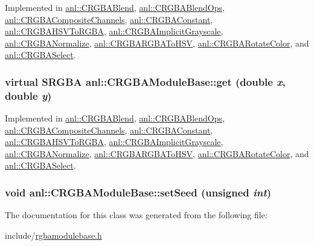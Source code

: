 Implemented in \hyperlink{classanl_1_1CRGBABlend_ab7a8d72d44e559e98eb3945b90db5d52}{anl::CRGBABlend}, \hyperlink{classanl_1_1CRGBABlendOps_a4548f067089dfd648ca57471379377ec}{anl::CRGBABlendOps}, \hyperlink{classanl_1_1CRGBACompositeChannels_a9c3fb9f5a932d5cdd585d53ecab11fa5}{anl::CRGBACompositeChannels}, \hyperlink{classanl_1_1CRGBAConstant_aba1cf079bf221502fe759880358b2370}{anl::CRGBAConstant}, \hyperlink{classanl_1_1CRGBAHSVToRGBA_a99b2e61622cc799b7112e285903c747c}{anl::CRGBAHSVToRGBA}, \hyperlink{classanl_1_1CRGBAImplicitGrayscale_aaa69d1f706bec33d288385fd44c602c7}{anl::CRGBAImplicitGrayscale}, \hyperlink{classanl_1_1CRGBANormalize_aaa04a3a2cb2ce5fd15e574731ac6f183}{anl::CRGBANormalize}, \hyperlink{classanl_1_1CRGBARGBAToHSV_a4d51e587ffc235a8620f516b2a701288}{anl::CRGBARGBAToHSV}, \hyperlink{classanl_1_1CRGBARotateColor_a8dbecf4dacad0814addb213cbd83b6cc}{anl::CRGBARotateColor}, and \hyperlink{classanl_1_1CRGBASelect_acc89668e15e5db0f377a8c35e920a223}{anl::CRGBASelect}.\hypertarget{classanl_1_1CRGBAModuleBase_afb6896d38ae92b9bb784fe5dc731ae67}{
\subsubsection[{get}]{\setlength{\rightskip}{0pt plus 5cm}virtual {\bf SRGBA} anl::CRGBAModuleBase::get (double {\em x}, \/  double {\em y})}}
\label{classanl_1_1CRGBAModuleBase_afb6896d38ae92b9bb784fe5dc731ae67}


Implemented in \hyperlink{classanl_1_1CRGBABlend_a3cc6fa4393c7cc41da66be7e460b609f}{anl::CRGBABlend}, \hyperlink{classanl_1_1CRGBABlendOps_aacba235e62c02f99459fed2e79992fe3}{anl::CRGBABlendOps}, \hyperlink{classanl_1_1CRGBACompositeChannels_afbae35ad9a4608d0d2a375636b538d8f}{anl::CRGBACompositeChannels}, \hyperlink{classanl_1_1CRGBAConstant_a2b2d721d125057ef64b73c8991f9cdf2}{anl::CRGBAConstant}, \hyperlink{classanl_1_1CRGBAHSVToRGBA_ad1a4aecb9c5faa9927f7a8292cc46546}{anl::CRGBAHSVToRGBA}, \hyperlink{classanl_1_1CRGBAImplicitGrayscale_a806ae7b00b96c104a926df3de2b9d3fb}{anl::CRGBAImplicitGrayscale}, \hyperlink{classanl_1_1CRGBANormalize_a02fcc5f3c5df6750712c28afa66a6ccd}{anl::CRGBANormalize}, \hyperlink{classanl_1_1CRGBARGBAToHSV_a8252d1e38975101abf4ea30a23595a3a}{anl::CRGBARGBAToHSV}, \hyperlink{classanl_1_1CRGBARotateColor_a14d2e43da4ad85d88b6bfce5e5cafcae}{anl::CRGBARotateColor}, and \hyperlink{classanl_1_1CRGBASelect_a43f0fe9cb33e1dab8488c2413337900d}{anl::CRGBASelect}.\hypertarget{classanl_1_1CRGBAModuleBase_abfb4be6818050558755c213501070e51}{
\subsubsection[{setSeed}]{\setlength{\rightskip}{0pt plus 5cm}void anl::CRGBAModuleBase::setSeed (unsigned {\em int})}}
\label{classanl_1_1CRGBAModuleBase_abfb4be6818050558755c213501070e51}


The documentation for this class was generated from the following file:\begin{DoxyCompactItemize}
\item 
include/\hyperlink{rgbamodulebase_8h}{rgbamodulebase.h}\end{DoxyCompactItemize}

